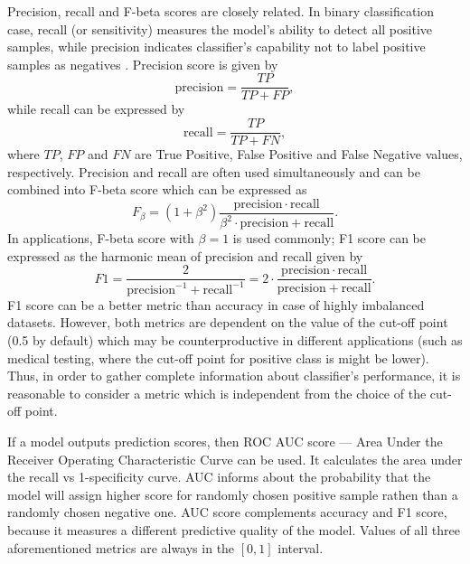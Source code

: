 \documentclass[magisterska, english]{pwr_wmat_praca_dyplomowa}
\theoremstyle{plain}
\numberwithin{theorem}{chapter}
\theoremstyle{definition}
\numberwithin{theorem}{chapter}
\begin{document}
Precision, recall and F-beta scores are closely related. In binary classification case, recall (or sensitivity) measures the model's ability to detect all positive samples, while precision indicates classifier's capability not to label positive samples as negatives \cite{sklearn}. Precision score is given by \cite{sklearn}
\begin{equation}
    \mathrm{precision} = \frac{TP}{TP+FP},
\end{equation}
while recall can be expressed by
\begin{equation}
    \mathrm{recall} = \frac{TP}{TP+FN},
\end{equation}
where $TP$, $FP$ and $FN$ are True Positive, False Positive and False Negative values, respectively. Precision and recall are often used simultaneously and can be combined into F-beta score which can be expressed as \cite{sklearn}
\begin{equation}\label{eq:beta}
F_{\beta} = (1+\beta^2)\frac{\mathrm{precision}\cdot \mathrm{recall}}{\beta^2\cdot \mathrm{precision} + \mathrm{recall}}.
\end{equation}
In applications,  F-beta score with $\beta = 1$ is used commonly; F1 score can be expressed as the harmonic mean of precision and recall given by
\begin{equation}\label{eq:F1}
    F1 = \frac{2}{\mathrm{precision}^{-1} + \mathrm{recall}^{-1}} = 2\cdot \frac{\mathrm{precision}\cdot \mathrm{recall}}{\mathrm{precision} + \mathrm{recall}}.
\end{equation}
F1 score can be a better metric than accuracy in case of highly imbalanced datasets. However, both metrics are dependent on the value of the cut-off point (0.5 by default) which may be counterproductive in different applications (such as medical testing, where the cut-off point for positive class is might be lower). Thus, in order to gather complete information about classifier's performance, it is reasonable to consider a metric which is independent from the choice of the cut-off point. 

If a model outputs prediction scores, then ROC AUC score --- Area Under the Receiver Operating Characteristic Curve can be used. It calculates the area under the recall vs 1-specificity curve. AUC informs about the probability that the model will assign higher score for randomly chosen positive sample rathen than a randomly chosen negative one. AUC score complements accuracy and F1 score, because it measures a different predictive quality of the model. Values of all three aforementioned metrics are always in the $[0,1]$ interval.
\end{document}
